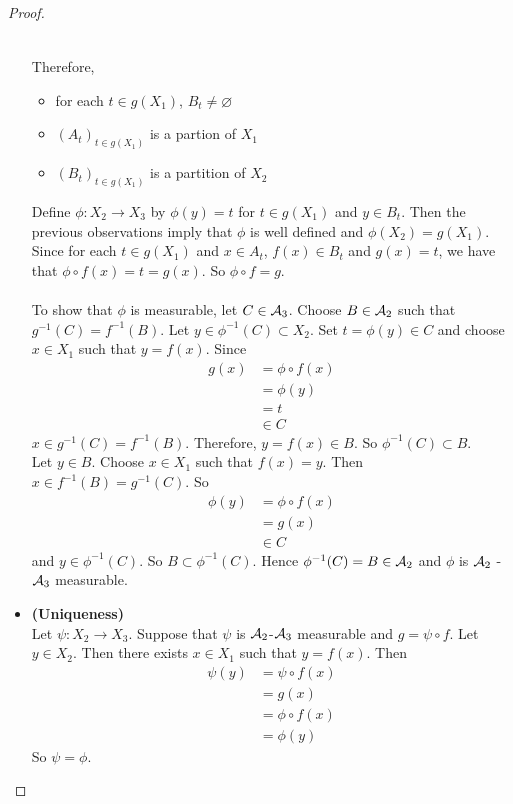 \documentclass{book}
\begin{document}
\begin{proof}
\begin{itemize}
\begin{itemize}
\begin{align*}
				\end{align*}
			\end{itemize}
			Therefore, 
			\begin{itemize}
				\item for each $t \in g(X_1)$, $B_t \neq \varnothing$
				\item $(A_t)_{t \in g(X_1)}$ is a partion of $X_1$
				\item $(B_t)_{t \in g(X_1)}$ is a partition of $X_2$\\
			\end{itemize}		
			Define $\phi:X_2 \rightarrow X_3$ by $\phi(y) = t$ for $t \in g(X_1)$ and $y \in B_t $. Then the previous observations imply that $\phi$ is well defined and $\phi(X_2) = g(X_1)$. Since for each $t \in g(X_1)$ and $x \in A_t$, $f(x) \in B_t$ and $g(x) = t$, we have that $\phi \circ f (x) = t = g(x)$. So $\phi \circ f = g$. \\ \\
			To show that $\phi$ is measurable, let $C \in \mathcal{A}_3$. Choose $B \in \mathcal{A}_2$ such that $g^{-1}(C) = f^{-1}(B)$.
			Let $y \in \phi^{-1}(C) \subset X_2$. Set $t = \phi(y) \in C$ and choose $x \in X_1$ such that $y = f(x)$. Since 
			\begin{align*}
				g(x) 
				&= \phi \circ f (x) \\
				&= \phi(y) \\
				&= t \\
				&\in C
			\end{align*}		
			$x \in g^{-1}(C) = f^{-1}(B)$. Therefore, $y = f(x) \in B$. So $\phi^{-1}(C) \subset B$. \\
			Let $y \in B$. Choose $x \in X_1$ such that $f(x) = y$. Then $x \in f^{-1}(B) = g^{-1}(C)$. So 
			\begin{align*}
				\phi(y) 
				&= \phi \circ f (x) \\
				&= g(x) \\
				&\in C
			\end{align*}	 
			and $y \in \phi^{-1}(C)$. So $B \subset \phi^{-1}(C)$. 
			Hence $\phi^{-1}(C) = B \in \mathcal{A}_2$ and $\phi$ is $\mathcal{A}_2$ - $\mathcal{A}_3$ measurable.\\
			\item \textbf{(Uniqueness)} \\
			Let $\psi: X_2 \rightarrow X_3$. Suppose that $\psi$ is $\mathcal{A}_2$-$\mathcal{A}_3$ measurable and $g = \psi \circ f$. Let $y \in X_2$. Then there exists $x \in X_1$ such that $y = f(x)$. Then 
			\begin{align*}
				\psi(y) 
				&= \psi \circ f(x) \\
				&= g(x) \\
				&= \phi \circ f(x) \\
				&= \phi(y)
			\end{align*}
			So $\psi = \phi$.
		\end{itemize}
		
	\end{proof}
	
\end{document}
